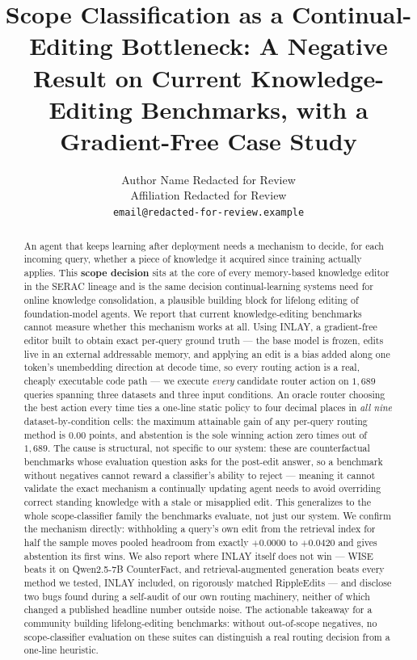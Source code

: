\documentclass{article}
\title{Scope Classification as a Continual-Editing Bottleneck: A Negative
Result on Current Knowledge-Editing Benchmarks, with a Gradient-Free Case
Study}
\author{%
  Author Name Redacted for Review \\
  Affiliation Redacted for Review \\
  \texttt{email@redacted-for-review.example}
}
\begin{document}
\maketitle

\begin{abstract}
An agent that keeps learning after deployment needs a mechanism to decide,
for each incoming query, whether a piece of knowledge it acquired since
training actually applies. This \textbf{scope decision} sits at the core of
every memory-based knowledge editor in the SERAC lineage and is the same
decision continual-learning systems need for online knowledge
consolidation, a plausible building block for lifelong editing of
foundation-model agents. We report that current knowledge-editing
benchmarks cannot measure whether this mechanism works at all. Using INLAY,
a gradient-free editor built to obtain exact per-query ground truth --- the
base model is frozen, edits live in an external addressable memory, and
applying an edit is a bias added along one token's unembedding direction at
decode time, so every routing action is a real, cheaply executable code
path --- we execute \emph{every} candidate router action on $1{,}689$
queries spanning three datasets and three input conditions. An oracle
router choosing the best action every time ties a one-line static policy to
four decimal places in \emph{all nine} dataset-by-condition cells: the
maximum attainable gain of any per-query routing method is $0.00$ points,
and abstention is the sole winning action zero times out of $1{,}689$. The
cause is structural, not specific to our system: these are counterfactual
benchmarks whose evaluation question asks for the post-edit answer, so a
benchmark without negatives cannot reward a classifier's ability to reject
--- meaning it cannot validate the exact mechanism a continually updating
agent needs to avoid overriding correct standing knowledge with a stale or
misapplied edit. This generalizes to the whole scope-classifier family the
benchmarks evaluate, not just our system. We confirm the mechanism
directly: withholding a query's own edit from the retrieval index for half
the sample moves pooled headroom from exactly $+0.0000$ to $+0.0420$ and
gives abstention its first wins. We also report where INLAY itself does not
win --- WISE beats it on Qwen2.5-7B CounterFact, and retrieval-augmented
generation beats every method we tested, INLAY included, on rigorously
matched RippleEdits --- and disclose two bugs found during a self-audit of
our own routing machinery, neither of which changed a published headline
number outside noise. The actionable takeaway for a community building
lifelong-editing benchmarks: without out-of-scope negatives, no
scope-classifier evaluation on these suites can distinguish a real routing
decision from a one-line heuristic.
\end{abstract}
\end{document}

